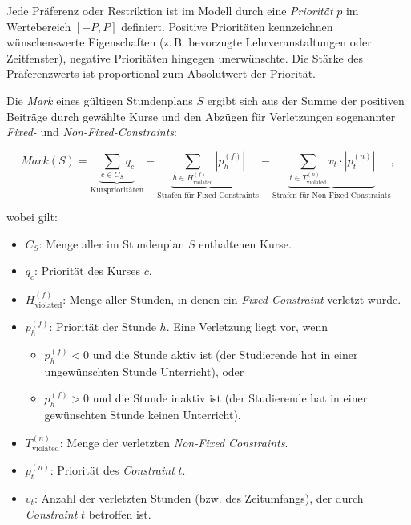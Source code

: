 Jede Präferenz oder Restriktion ist im Modell durch eine \textit{Priorität} \(p\) im Wertebereich \([-P, P]\) definiert. Positive Prioritäten kennzeichnen wünschenswerte Eigenschaften (z.\,B. bevorzugte Lehrveranstaltungen oder Zeitfenster), negative Prioritäten hingegen unerwünschte. Die Stärke des Präferenzwerts ist proportional zum Absolutwert der Priorität.

Die \textit{Mark} eines gültigen Stundenplans \(S\) ergibt sich aus der Summe der positiven Beiträge durch gewählte Kurse und den Abzügen für Verletzungen sogenannter \textit{Fixed-} und \textit{Non-Fixed-Constraints}:

\begin{equation}
  Mark(S) =
  \underbrace{\sum_{c \in C_S} q_c}_{\text{Kursprioritäten}}
  - \underbrace{\sum_{h \in H_{\text{violated}}^{(f)}} |p_h^{(f)}|}_{\text{Strafen für Fixed-Constraints}}
  - \underbrace{\sum_{t \in T_{\text{violated}}^{(n)}} v_t \cdot |p_t^{(n)}|}_{\text{Strafen für Non-Fixed-Constraints}},
  \label{eq:mark}
\end{equation}

wobei gilt:

\begin{itemize}
  \item \(C_S\): Menge aller im Stundenplan \(S\) enthaltenen Kurse.
  \item \(q_c\): Priorität des Kurses \(c\).
  \item \(H_{\text{violated}}^{(f)}\): Menge aller Stunden, in denen ein \textit{Fixed Constraint} verletzt wurde.
  \item \(p_h^{(f)}\): Priorität der Stunde \(h\). Eine Verletzung liegt vor, wenn
        \begin{itemize}
          \item \(p_h^{(f)} < 0\) und die Stunde aktiv ist (der Studierende hat in einer ungewünschten Stunde Unterricht), oder
          \item \(p_h^{(f)} > 0\) und die Stunde inaktiv ist (der Studierende hat in einer gewünschten Stunde keinen Unterricht).
        \end{itemize}
  \item \(T_{\text{violated}}^{(n)}\): Menge der verletzten \textit{Non-Fixed Constraints}.
  \item \(p_t^{(n)}\): Priorität des \textit{Constraint} \(t\).
  \item \(v_t\): Anzahl der verletzten Stunden (bzw. des Zeitumfangs), der durch \textit{Constraint} \(t\) betroffen ist.
\end{itemize}

